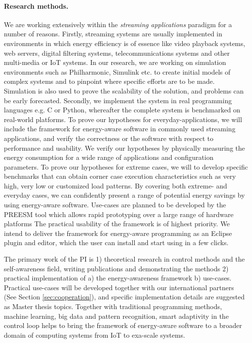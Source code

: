 \documentclass{article}
\begin{document}
\paragraph{Research methods. }
We are working extensively within the \textit{streaming applications} paradigm for a number of reasons. 
Firstly, streaming systems are usually implemented in environments in which energy efficiency is of essence like video playback systems, web servers, digital filtering systems, telecommunications systems and other multi-media or IoT systems.
In our research, we are working on simulation environments such as Philharmonic, Simulink etc. to create initial models of complex systems and to pinpoint where specific efforts are to be made.
Simulation is also used to prove the scalability of the solution, and problems can be early forecasted.
Secondly, we implement the system in real programming languages e.g. C or Python, whereafter the complete system is benchmarked on real-world platforms.
To prove our hypotheses for everyday-applications, we will include the framework for energy-aware software in commonly used streaming applications, and verify the correctness or the software with respect to performance and usability.
We verify our hypotheses by physically measuring the energy consumption for a wide range of applications and configuration parameters.
To prove our hypotheses for extreme cases, we will to develop specific benchmarks that can obtain corner case execution characteristics such as very high, very low or customized load patterns.
By covering both extreme- and everyday cases, we can confidently present a range of potential energy savings by using energy-aware software.
Use-cases are planned to be developed by the PREESM tool which allows rapid prototyping over a large range of hardware platforms
The practical usability of the framework is of highest priority.
We intend to deliver the framework for energy-aware programming as an Eclipse plugin and editor, which the user can install and start using in a few clicks.\smallskip

The primary work of the PI is 1) theoretical research in control methods and the self-awareness field, writing publications and demonstrating the methods 2) practical implementation of a) the energy-awareness framework b) use-cases.
Practical use-cases will be developed together with our international partners (See Section \ref{sec:cooperation}), and specific implementation details are suggested as Master thesis topics.
Together with traditional programming methods, machine learning, big data and pattern recognition, smart adaptivity in the control loop helps to bring the framework of energy-aware software to a broader domain of computing systems from IoT to exa-scale systems.
\end{document}
